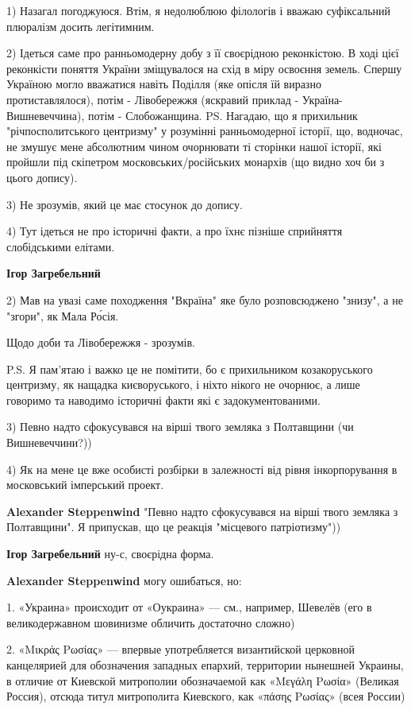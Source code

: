 \begin{itemize}
\begin{itemize} %

1) Назагал погоджуюся. Втім, я недолюблюю філологів і вважаю суфіксальний
плюралізм досить легітимним.

2) Ідеться саме про ранньомодерну добу з її своєрідною реконкістою. В ході цієї
реконкісти поняття України зміщувалося на схід в міру освоєння земель. Спершу
Україною могло вважатися навіть Поділля (яке опісля їй виразно
протиставлялося), потім - Лівобережжя (яскравий приклад -
Україна-Вишневеччина), потім - Слобожанщина. PS. Нагадаю, що я прихильник
"річпосполитського центризму" у розумінні ранньомодерної історії, що, водночас,
не змушує мене абсолютним чином очорнювати ті сторінки нашої історії, які
пройшли під скіпетром московських/російських монархів (що видно хоч би з цього
допису).

3) Не зрозумів, який це має стосунок до допису.

4) Тут ідеться не про історичні факти, а про їхнє пізніше сприйняття
слобідськими елітами.


\textbf{Ігор Загребельний} 

2) Мав на увазі саме походження "Вкраїна" яке було розповсюджено "знизу", а не
"згори", як Мала Ро́сія.

Щодо доби та Лівобережжя - зрозумів.

P.S. Я пам'ятаю і важко це не помітити, бо є прихильником козакоруського
центризму, як нащадка києворуського, і ніхто нікого не очорнює, а лише говоримо
та наводимо історичні факти які є задокументованими.

3) Певно надто сфокусувався на вірші твого земляка з Полтавщини (чи
Вишневеччини?))

4) Як на мене це вже особисті розбірки в залежності від рівня інкорпорування в
московський імперський проект.

\textbf{Alexander Steppenwind} "Певно надто сфокусувався на вірші твого земляка з Полтавщини". Я припускав, що це реакція "місцевого патріотизму"))

\textbf{Ігор Загребельний} ну-с, своєрідна форма.

\textbf{Alexander Steppenwind} могу ошибаться, но:

1. «Украина» происходит от «Оукраина» — см., например, Шевелёв (его в
великодержавном шовинизме обличить достаточно сложно)

2. «Μικράς Ρωσίας» — впервые употребляется византийской церковной канцелярией
для обозначения западных епархий, территории нынешней Украины, в отличие от
Киевской митрополии обозначаемой как «Μεγάλη Ρωσία» (Великая Россия), отсюда
титул митрополита Киевского, как «πάσης Ρωσίας» (всея России)


\end{itemize}
\end{itemize}
